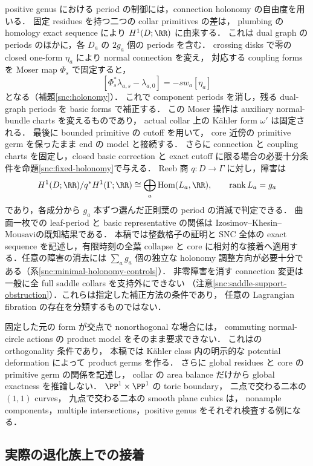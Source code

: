 positive genus における period の制御には，connection holonomy の自由度を用いる．
固定 residues を持つ二つの collar primitives の差は，
plumbing の homology exact sequence により $H^1(D;\RR)$ に由来する．
これは dual graph の periods のほかに，各 $D_a$ の $2g_a$ 個の periods を含む．
crossing disks で零の closed one-form $\eta_a$ により normal connection を変え，
対応する coupling forms を Moser map $\Phi_s$ で固定すると，
\[
 [\Phi_s^*\lambda_{a,s}-\lambda_{a,0}]
       =-s w_a[\eta_a]
\]
となる（補題\ref{snc:holonomy}）．
これで component periods を消し，残る dual-graph periods を basic forms で補正する．
この Moser 操作は auxiliary normal-bundle charts を変えるものであり，
actual collar 上の Kähler form $\omega'$ は固定される．
最後に bounded primitive の cutoff を用いて，
core 近傍の primitive germ を保ったまま end の model と接続する．
さらに connection と coupling charts を固定し，closed basic correction と exact cutoff
に限る場合の必要十分条件を命題\ref{snc:fixed-holonomy}で与える．
Reeb 商 $q:D\to\Gamma$ に対し，障害は
\[
 H^1(D;\RR)/q^*H^1(\Gamma;\RR)
 \cong\bigoplus_a\operatorname{Hom}(L_a,\RR),\qquad
 \operatorname{rank}L_a=g_a
\]
であり，各成分から $g_a$ 本ずつ選んだ正則葉の period の消滅で判定できる．
曲面一枚での leaf-period と basic representative の関係は
Izosimov--Khesin--Mousavi\cite[Lemma 4.8, \S5]{IKM}の既知結果である．
本稿では整数格子の証明と SNC 全体の exact sequence を記述し，有限時刻の全葉 collapse と
core に相対的な接着へ適用する．任意の障害の消去には $\sum_a g_a$ 個の独立な holonomy
調整方向が必要十分である（系\ref{snc:minimal-holonomy-controls}）．
非零障害を消す connection 変更は一般に全 full saddle collars を支持外にできない
（注意\ref{snc:saddle-support-obstruction}）．これらは指定した補正方法の条件であり，
任意の Lagrangian fibration の存在を分類するものではない．

固定した元の form が交点で nonorthogonal な場合には，
commuting normal-circle actions の product model をそのまま要求できない．
これは\cite[Proposition 2.5]{BSV}の orthogonality 条件であり，
本稿では Kähler class 内の明示的な potential deformation によって product germs を作る．
さらに global residues と core の primitive germ の関係を記述し，
collar の area balance だけから global exactness を推論しない．
$\PP^1\times\PP^1$ の toric boundary，
二点で交わる二本の $(1,1)$ curves，
九点で交わる二本の smooth plane cubics は，
nonample components，multiple intersections，positive genus をそれぞれ検査する例になる．

\subsection{実際の退化族上での接着}

